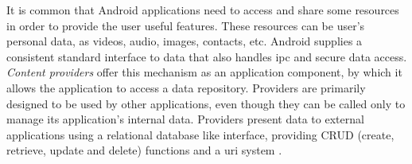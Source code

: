 It is common that Android applications need to access and share some resources in order to provide the user useful features. These resources can be user's personal data, as videos, audio, images, contacts, etc. Android supplies a consistent standard interface to data that also handles \gls{ipc} and secure data access. \textit{Content providers} offer this mechanism as an application component, by which it allows the application to access a data repository. Providers are primarily designed to be used by other applications, even though they can be called only to manage its application's internal data. Providers present data to external applications using a relational database like interface, providing CRUD (create, retrieve, update and delete) functions and a \gls{uri} system \cite{Providers:Android}.